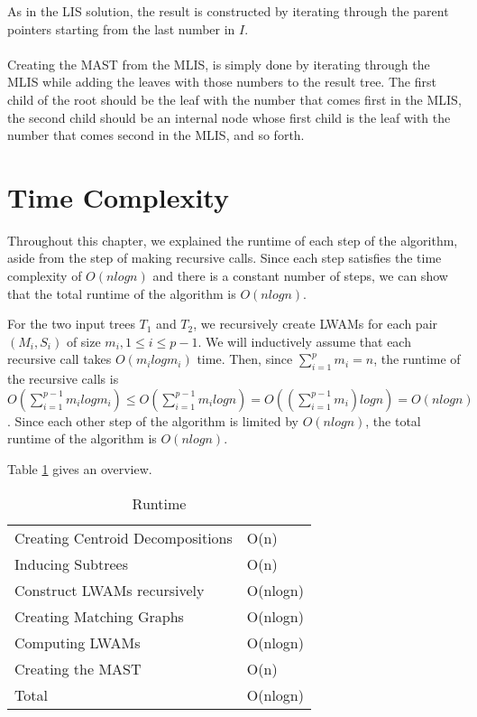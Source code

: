 
As in the LIS solution, the result is constructed by iterating through the parent pointers starting from the last number in $I$.\\
\\
Creating the MAST from the MLIS, is simply done by iterating through the MLIS while adding the leaves with those numbers to the result tree. The first child of the root should be the leaf with the number that comes first in the MLIS, the second child should be an internal node whose first child is the leaf with the number that comes second in the MLIS, and so forth.


\section{Time Complexity}
Throughout this chapter, we explained the runtime of each step of the algorithm, aside from the step of making recursive calls. Since each step satisfies the time complexity of $O(nlogn)$ and there is a constant number of steps, we can show that the total runtime of the algorithm is $O(nlogn)$.

For the two input trees $T_1$ and $T_2$, we recursively create LWAMs for each pair $(M_i, S_i)$ of size $m_i, 1 \le i \le p-1$. We will inductively assume that each recursive call takes $O(m_ilogm_i)$ time. Then, since $\sum_{i=1}^p m_i = n$, the runtime of the recursive calls is $O(\sum_{i=1}^{p-1} m_ilogm_i) \le O(\sum_{i=1}^{p-1} m_ilogn) = O((\sum_{i=1}^{p-1} m_i)logn) = O(nlogn)$. Since each other step of the algorithm is limited by $O(nlogn)$, the total runtime of the algorithm is $O(nlogn)$.

Table \ref{runtimeTable} gives an overview.
\begin{table}[]
	\centering
	\begin{tabular}{l|l}
		Creating Centroid Decompositions & O(n)     \\
		Inducing Subtrees                & O(n)     \\
		Construct LWAMs recursively		 & O(nlogn) \\
		Creating Matching Graphs         & O(nlogn) \\
		Computing LWAMs                  & O(nlogn) \\
		Creating the MAST                & O(n)     \\ \hline
		Total                            & O(nlogn)
	\end{tabular}
	\caption{Runtime}
	\label{runtimeTable}
\end{table}

